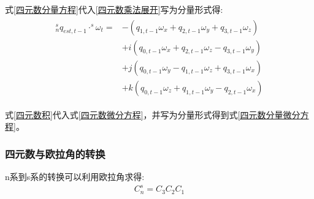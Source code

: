 \documentclass[12pt,a4paper]{article}
\begin{document}
式\ref{四元数分量方程}代入\ref{四元数乘法展开}写为分量形式得:
\begin{eqnarray}\label{四元数积}
    \begin{split} 
        ^s_nq_{est,t-1}\cdot^s\omega_t=&-(q_{1,t-1}\omega_x+q_{2,t-1}\omega_y+q_{3,t-1}\omega_z) \\
                                       &+i(q_{0,t-1}\omega_x+q_{2,t-1}\omega_z-q_{3,t-1}\omega_y) \\
                                       &+j(q_{0,t-1}\omega_y-q_{1,t-1}\omega_z+q_{3,t-1}\omega_x) \\
                                       &+k(q_{0,t-1}\omega_z+q_{1,t-1}\omega_y-q_{2,t-1}\omega_x)
    \end{split}
\end{eqnarray} 

式\ref{四元数积}代入式\ref{四元数微分方程}，并写为分量形式得到式\ref{四元数分量微分方程}。

\subsubsection{四元数与欧拉角的转换}\label{section:四元数与欧拉角的转换}
n系到s系的转换可以利用欧拉角求得:
\begin{equation}\label{欧拉角方向余弦}
    \begin{split} 
        C^s_n=C_3C_2C_1
    \end{split}
\end{equation} 
\end{document}
